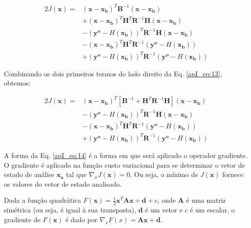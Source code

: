 \begin{equation}
  \label{apI_eq:13}
  \begin{aligned}
    2J(\mathbf{x}) = {} & (\mathbf{x} - \mathbf{x_{b}})^{T}\mathbf{B}^{-1}(\mathbf{x} - \mathbf{x_{b}}) \\
    & + (\mathbf{x} - \mathbf{x_{b}})^{T}\mathbf{H}^{T}\mathbf{R}^{-1}\mathbf{H}(\mathbf{x} - \mathbf{x_{b}}) \\
                & - (\mathbf{y^{o}} - \textit{H}(\mathbf{x_{b}}))^{T}\mathbf{R}^{-1}\mathbf{H}(\mathbf{x} - \mathbf{x_{b}}) \\
                & - (\mathbf{x} - \mathbf{x_{b}})^{T}\mathbf{H}^{T}\mathbf{R}^{-1}(\mathbf{y^{o}} - \textit{H}(\mathbf{x_{b}})) \\
                & + (\mathbf{y^{o}} - \textit{H}(\mathbf{x_{b}}))^{T}\mathbf{R}^{-1}(\mathbf{y^{o}} - \textit{H}(\mathbf{x_{b}}))
  \end{aligned}  
\end{equation}

Combinando os dois primeiros termos do lado direito da Eq. \ref{apI_eq:13}, obtemos:

\begin{equation}
  \label{apI_eq:14}
  \begin{aligned}
    2J(\mathbf{x}) = {} & (\mathbf{x} - \mathbf{x_{b}})^{T}[\mathbf{B}^{-1} + \mathbf{H}^{T}\mathbf{R}^{-1}\mathbf{H}](\mathbf{x} - \mathbf{x_{b}}) \\
                & - (\mathbf{y^{o}} - \textit{H}(\mathbf{x_{b}}))^{T}\mathbf{R}^{-1}\mathbf{H}(\mathbf{x} - \mathbf{x_{b}}) \\
                & - (\mathbf{x} - \mathbf{x_{b}})^{T}\mathbf{H}^{T}\mathbf{R}^{-1}(\mathbf{y^{o}} - \textit{H}(\mathbf{x_{b}})) \\
                & + (\mathbf{y^{o}} - \textit{H}(\mathbf{x_{b}}))^{T}\mathbf{R}^{-1}(\mathbf{y^{o}} - \textit{H}(\mathbf{x_{b}}))
  \end{aligned}  
\end{equation}

A forma da Eq. \ref{apI_eq:14} é a forma em que será aplicado o operador gradiente. O gradiente é aplicado na função custo variacional para se determinar o vetor de estado de análise $\mathbf{x_{a}}$ tal que $\nabla_{x}{J(\mathbf{x})} = 0$. Ou seja, o mínimo de $J(\mathbf{x})$ fornece os valores do vetor de estado analisado.\\

\begin{teorema}
\label{apI_teo1}
Dada a função quadrática $F(\mathbf{x}) = \frac{1}{2}\mathbf{x}^{T}\mathbf{A}\mathbf{x} + \mathbf{d} + c$, onde $\mathbf{A}$ é uma matriz simétrica (ou seja, é igual à sua transposta), $\mathbf{d}$ é um vetor e $c$ é um escalar, o gradiente de $F(\mathbf{x})$ é dado por $\nabla_{x}{F(x)} = \mathbf{A}\mathbf{x} + \mathbf{d}$.
\end{teorema}

